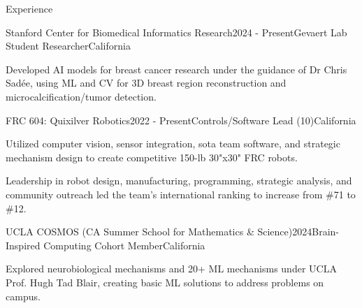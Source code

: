 \documentclass[
  11pt, %
]{resume}
\begin{document}
\sloppy


\begin{rSection}{Experience}


  \begin{rSubsection}{Stanford Center for Biomedical Informatics Research}{2024 - Present}{Gevaert Lab Student Researcher}{California}
    
    \item Developed AI models for breast cancer research under the guidance of Dr Chris Sadée, using ML and CV for 3D breast region reconstruction and microcalcification/tumor detection.
    
  \end{rSubsection}
        
  \begin{rSubsection}{FRC 604: Quixilver Robotics}{2022 - Present}{Controls/Software Lead (10)}{California}
    
    \item Utilized computer vision, sensor integration, sota team software, and strategic mechanism design to create competitive 150-lb 30"x30" FRC robots.
    
    \item Leadership in robot design, manufacturing, programming, strategic analysis, and community outreach led the team's international ranking to increase from \#71 to \#12.
    
  \end{rSubsection}
        
  \begin{rSubsection}{UCLA COSMOS (CA Summer School for Mathematics \& Science)}{2024}{Brain-Inspired Computing Cohort Member}{California}
    
    \item Explored neurobiological mechanisms and 20+ ML mechanisms under UCLA Prof. Hugh Tad Blair, creating basic ML solutions to address problems on campus.
    
  \end{rSubsection}
        
	
\end{rSection}

\end{document}
